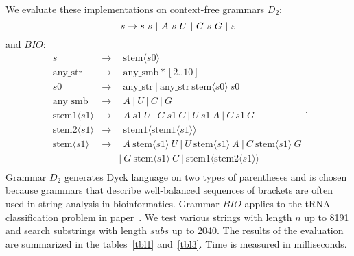 We evaluate these implementations on context-free grammars $D_2$: 
$$
s  \rightarrow  s \ s \ | \ A \ s \ U \ | \ C \ s \ G \ | \ \varepsilon \\
$$ and $BIO$: \[
    \begin{array}{rcl}
            s & \rightarrow & \ \ \text{stem}\langle s0 \rangle \\
            \text{any\_str} & \rightarrow & \ \ \text{any\_smb}*[2..10] \\
            s0 & \rightarrow & \ \ \text{any\_str} \ | \ \text{any\_str} \ \text{stem}\langle s0 \rangle \ s0 \\
            \text{any\_smb} & \rightarrow &  \ \ A \ | \ U \ | \ C \ | \  G \\
            \text{stem1}\langle s1 \rangle & \rightarrow & \ \ A \ s1 \  U \ | \ G \ s1 \ C \ | \ U \ s1 \ A \ | \ C \ s1 \ G \\
            \text{stem2}\langle s1 \rangle & \rightarrow & \ \ \text{stem1}\langle \text{stem1}\langle s1 \rangle \rangle \\
            \text{stem}\langle s1 \rangle & \rightarrow & \ \ A \ \text{stem}\langle s1 \rangle \ U
              \ | \ U \ \text{stem}\langle s1 \rangle \ A \ | \ C \ \text{stem}\langle s1 \rangle \ G \\
              & & | \ G \ \text{stem}\langle s1 \rangle \ C 
              \  | \ \text{stem1}\langle \text{stem2}\langle s1 \rangle \rangle \\
    \end{array}.
    \]
Grammar $D_2$ generates Dyck language on two types of parentheses and is chosen because grammars that describe well-balanced sequences of brackets are often used in string analysis in bioinformatics. 
Grammar $BIO$ applies to the tRNA classification problem in paper~\cite{bioinformatics19}.
We test various strings with length $n$ up to 8191 and search substrings with length $subs$ up to 2040. The results of the evaluation are summarized in the tables~\ref{tbl1} and~\ref{tbl3}. Time is measured in milliseconds.



